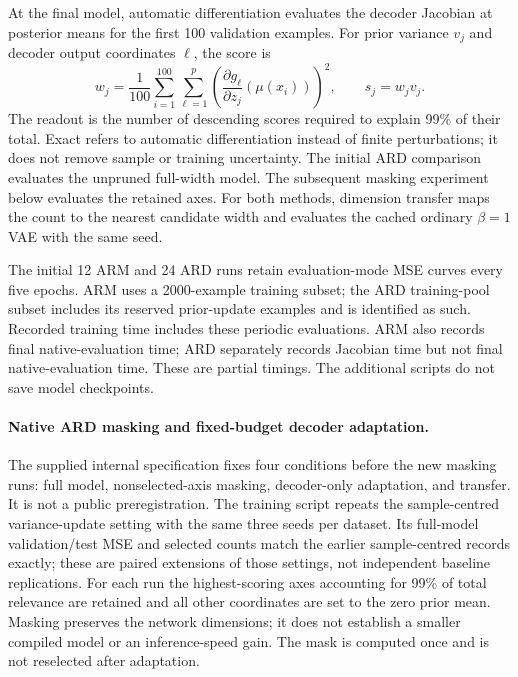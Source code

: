 At the final model, automatic differentiation evaluates the decoder
Jacobian at posterior means for the first 100 validation examples.
For prior variance $v_j$ and decoder output coordinates $\ell$, the score is
\begin{equation}
 w_j=\frac{1}{100}\sum_{i=1}^{100}\sum_{\ell=1}^{p}
 \left(\frac{\partial g_\ell}{\partial z_j}(\mu(x_i))\right)^2,
 \qquad s_j=w_jv_j.
 \label{eq:exactard}
\end{equation}
The readout is the number of descending scores required to explain
99\% of their total. Exact refers to automatic differentiation instead
of finite perturbations; it does not remove sample or training uncertainty.
The initial ARD comparison evaluates the unpruned full-width model.
The subsequent masking experiment below evaluates the retained axes.
For both methods,
dimension transfer maps the count to the nearest candidate width and
evaluates the cached ordinary $\beta=1$ VAE with the same seed.

The initial 12 ARM and 24 ARD runs retain evaluation-mode MSE curves every five epochs.
ARM uses a 2000-example training subset; the ARD training-pool subset
includes its reserved prior-update examples and is identified as such.
Recorded training time includes these periodic evaluations. ARM also
records final native-evaluation time; ARD separately records Jacobian
time but not final native-evaluation time. These are partial timings.
The additional scripts do not save model checkpoints.

\paragraph{Native ARD masking and fixed-budget decoder adaptation.}
The supplied internal specification fixes four conditions before the
new masking runs: full model, nonselected-axis masking, decoder-only
adaptation, and transfer. It is not a public preregistration.
The training script repeats the sample-centred variance-update setting
with the same three seeds per dataset. Its full-model validation/test
MSE and selected counts match the earlier sample-centred records exactly;
these are paired extensions of those settings, not independent baseline
replications. For each run the highest-scoring axes accounting for
99\% of total relevance are retained and
all other coordinates are set to the zero prior mean. Masking preserves
the network dimensions; it does not establish a smaller compiled model
or an inference-speed gain. The mask is computed once and is not
reselected after adaptation.

